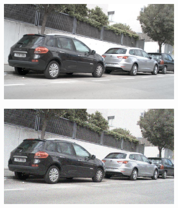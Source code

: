 \documentclass[a4paper]{ctexart}
\begin{document}
\begin{figure}[htbp]
\begin{subfigure}{0.08\textwidth}
				\label{fig：Gamma=0.9, Gauss Noise = 1.0}
			\end{subfigure} \\
			
			\vspace{-15pt}
			
			\begin{subfigure}{0.02\textwidth}
				\captionsetup{font=scriptsize}
				\caption*{}
				\vspace{-2pt}
			\end{subfigure}
			\begin{subfigure}{0.08\textwidth}
				\captionsetup{font=scriptsize}
				\includegraphics[width=\linewidth]{picture/Edge Detection/degrade/RGB_001 Gamma=1.0, Gauss Noise=0.0}
				\label{fig: Gamma=1.0, Gauss Noise = 0.0}
			\end{subfigure}
			\begin{subfigure}{0.08\textwidth}
				\captionsetup{font=scriptsize}
				\includegraphics[width=\linewidth]{picture/Edge Detection/degrade/RGB_001 Gamma=1.0, Gauss Noise=0.1}

\end{subfigure}
\end{figure}
\end{document}
